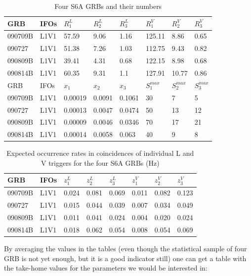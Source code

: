 \documentclass[epsf]{article}
\begin{document}
\begin{table}[ht]
 \begin{tabular}{|l|l|l|l|l|l|l|l|}
 \hline
 \hline
 GRB & IFOs & $R_{1}^L$ & $R_{2}^L$ & $R_{3}^L$ & $R_{1}^V$ & $R_{2}^V$ & $R_{3}^V$ \\
 \hline
 090709B & L1V1 & 57.59 & 9.06 & 1.16 & 125.11 & 8.86 & 0.65 \\
 \hline
 090727 & L1V1 & 51.38 & 7.26 & 1.03 & 112.75 & 9.43 & 0.82 \\
 \hline
 090809B & L1V1 & 39.41 & 4.31 & 0.68 & 122.15 & 8.98 & 0.68 \\
 \hline
 090814B & L1V1 & 60.35 & 9.31 & 1.1 & 127.91 & 10.77 & 0.86 \\
 \hline
 \hline
 GRB & IFOs & $x_1$ & $x_2$ & $x_3$ & $S^{max}_1$ & $S^{max}_2$ & $S^{max}_3$  \\
 \hline
 090709B & L1V1 & 0.00019 & 0.0091 & 0.1061 & 30 & 7 & 5 \\
 \hline
 090727 & L1V1 & 0.00013 & 0.0047 & 0.0474 & 50 & 13 & 12 \\
 \hline
 090809B & L1V1 & 0.00009 & 0.0046 & 0.0346 & 70 & 17 & 21 \\
 \hline
 090814B & L1V1 & 0.00014 & 0.0058 & 0.063 & 40 & 9 & 8 \\
 \hline
 \hline
 \end{tabular} 
 \caption{Four S6A GRBs and their numbers}
 \label{Table 3}
\end{table}

\begin{table}[ht]
 \begin{tabular}{|l|l|l|l|l|l|l|l|}
 \hline
 \hline
 GRB & IFOs & $z_{1}^L$ & $z_{2}^L$ & $z_{3}^L$ & $z_{1}^V$ & $z_{2}^V$ & $z_{3}^V$  \\
 \hline
 090709B & L1V1 & 0.024 & 0.081 & 0.069 & 0.011 & 0.082 & 0.123 \\
 \hline
 090727 & L1V1 & 0.015 & 0.044 & 0.039 & 0.007 & 0.034 & 0.049 \\
 \hline
 090809B & L1V1 & 0.011 & 0.041 & 0.024 & 0.004 & 0.020 & 0.024 \\
 \hline
 090814B & L1V1 & 0.018 & 0.062 & 0.054 & 0.008 & 0.054 & 0.069 \\
 \hline
 \hline
 \end{tabular} 
 \caption{Expected occurrence rates in coincidences of individual L and V triggers for the four S6A GRBs (Hz)}
 \label{Table 3}
\end{table}

By averaging the values in the tables (even though the statistical sample of four GRB is not yet enough, but it is a good indicator still) one can get a table with the take-home values for the parameters we would be interested in:
\end{document}
